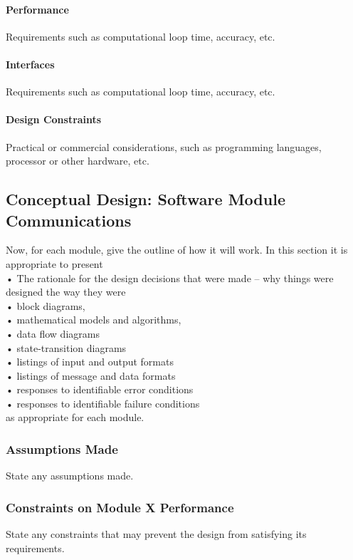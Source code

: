 \documentclass[MTRX3700report.tex]{subfiles}
\begin{document}
\paragraph{Performance}
Requirements such as computational loop time, accuracy, etc.
\paragraph{Interfaces}
Requirements such as computational loop time, accuracy, etc.
\paragraph{Design Constraints}
Practical or commercial considerations, such as programming languages, processor or other hardware, etc.

\subsection{Conceptual Design: Software Module Communications}
Now, for each module, give the outline of how it will work. In this section it is appropriate to present \\
•	The rationale for the design decisions that were made – why things were designed the way they were\\
•	block diagrams,\\
•	mathematical models and algorithms,\\
•	data flow diagrams\\
•	state-transition diagrams\\
•	listings of input and output formats\\
•	listings of message and data formats\\
•	responses to identifiable error conditions\\
•	responses to identifiable failure conditions\\
as appropriate for each module.

\subsubsection{Assumptions Made}
State any assumptions made.
\subsubsection{Constraints on Module X Performance}
State any constraints that may prevent the design from satisfying its requirements.
\end{document}
